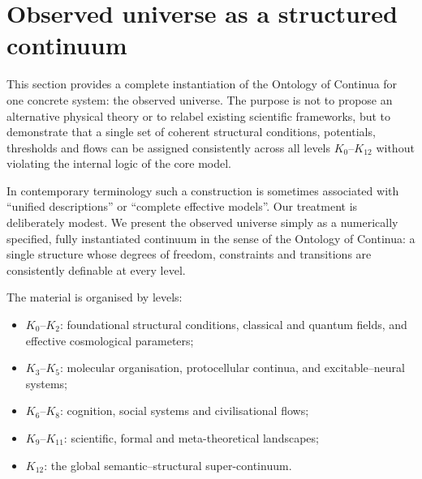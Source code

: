 
\section{Observed universe as a structured continuum}
\label{sec:observed-universe-continuum}

This section provides a complete instantiation of the Ontology of Continua
for one concrete system: the observed universe. 
The purpose is not to propose an alternative physical theory or to
relabel existing scientific frameworks, but to demonstrate that a single
set of coherent structural conditions, potentials, thresholds and flows 
can be assigned consistently across all levels \(K_0\)–\(K_{12}\) without
violating the internal logic of the core model.

In contemporary terminology such a construction is sometimes associated 
with ``unified descriptions'' or ``complete effective models''. 
Our treatment is deliberately modest. 
We present the observed universe simply as a numerically specified, 
fully instantiated continuum in the sense of the Ontology of Continua: 
a single structure whose degrees of freedom, constraints and transitions 
are consistently definable at every level.

The material is organised by levels:
\begin{itemize}
    \item \(K_0\)–\(K_2\): foundational structural conditions, classical and 
          quantum fields, and effective cosmological parameters;
    \item \(K_3\)–\(K_5\): molecular organisation, protocellular continua, 
          and excitable–neural systems;
    \item \(K_6\)–\(K_8\): cognition, social systems and civilisational flows;
    \item \(K_9\)–\(K_{11}\): scientific, formal and meta-theoretical 
          landscapes;
    \item \(K_{12}\): the global semantic–structural super-continuum.
\end{itemize}


